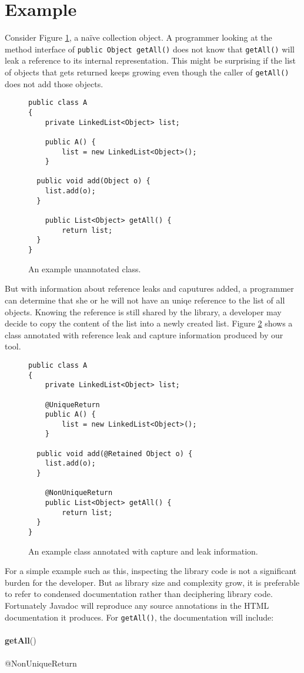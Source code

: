 \section{Example}
\label{sec:Example}

Consider Figure \ref{fig:pre}, a na\"ive collection object.
A programmer looking at the method interface of 
\texttt{public Object getAll()} does not know
that \texttt{getAll()} will leak a reference to its
internal representation. This might be surprising
if the list of objects that gets returned keeps growing
even though the caller of \texttt{getAll()} does not add those objects.

\begin{figure}[h]
\begin{lstlisting}
public class A
{
	private LinkedList<Object> list;
		
	public A() {
		list = new LinkedList<Object>();
	}
		
  public void add(Object o) {
   	list.add(o);
  }
    
	public List<Object> getAll() {
		return list;
  }
}
\end{lstlisting}
\caption{An example unannotated class.}
\label{fig:pre}
\end{figure}

But with information about reference leaks and caputures added, a programmer can 
determine that she or he will not have an uniqe reference
to the list of all objects.  Knowing the reference is still shared by the
library, a developer may decide to copy the content 
of the list into a newly created list.  Figure \ref{fig:postannotation}
shows a class annotated with reference leak and capture information produced by
our tool.

\begin{figure}[h]
\begin{lstlisting}
public class A
{
	private LinkedList<Object> list;
	
	@UniqueReturn
	public A() {
		list = new LinkedList<Object>();
	}
		
  public void add(@Retained Object o) {
   	list.add(o);
  }
  
	@NonUniqueReturn
	public List<Object> getAll() {
		return list;
  }
}
\end{lstlisting}
\caption{An example class annotated with capture and leak information.}
\label{fig:postannotation}
\end{figure}

For a simple example such as this, inspecting the library code is not a
significant burden for the developer.  But as library size and complexity grow,
it is preferable to refer to condensed documentation rather than
deciphering library code.
Fortunately Javadoc will reproduce any source annotations in the HTML
documentation it produces.  For \texttt{getAll()}, the documentation will
include:\\
\\
{\bf getAll}()\\
\\
@NonUniqueReturn\\
